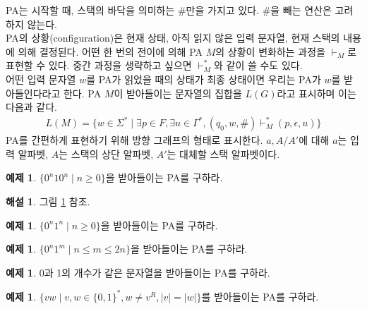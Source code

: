 \documentclass[b5paper, 11pt]{book}
\theoremstyle{definition}
\newtheorem{ex}[defn]{예제}
\newtheorem*{ans*}{해설}
\begin{document}
PA는 시작할 때, 스택의 바닥을 의미하는 \#만을 가지고 있다. \#을 빼는 연산은 고려하지 않는다. \\ 
PA의 상황(configuration)은 현재 상태, 아직 읽지 않은 입력 문자열, 현재 스택의 내용에 의해 결정된다. 어떤 한 번의 전이에 의해 PA $M$의 상황이 변화하는 과정을 $\vdash_M$로 표현할 수 있다. 중간 과정을 생략하고 싶으면 $\vdash_M^*$와 같이 쓸 수도 있다. \\ 
어떤 입력 문자열 $w$를 PA가 읽었을 때의 상태가 최종 상태이면 우리는 PA가 $w$를 받아들인다라고 한다. PA $M$이 받아들이는 문자열의 집합을 $L(G)$라고 표시하며 이는 다음과 같다.
\begin{align*}
    L(M) = \{w \in \Sigma^* \;\vert\; \exists p\in F, \exists u \in \Gamma^* , (q_0, w, \text{\#}) \vdash_M^* (p, \epsilon, u)\}
\end{align*}
PA를 간편하게 표현하기 위해 방향 그래프의 형태로 표시한다. $a, A/A'$에 대해 $a$는 입력 알파벳, $A$는 스택의 상단 알파벳, $A'$는 대체할 스택 알파벳이다. 
\begin{ex}\label{0n10n_ex}
    $\{0^n10^{n} \;\vert\; n \ge 0 \}$을 받아들이는 PA를 구하라. 
\end{ex}
\begin{ans*}
    그림 \ref{0n10n} 참조.
\end{ans*}
\begin{figure}[!ht]
    \centering
    \caption{} 
    \label{0n10n}
\end{figure}
\begin{ex}
    $\{0^n1^{n} \;\vert\; n \ge 0 \}$을 받아들이는 PA를 구하라.
\end{ex}
\begin{ex}
    $\{0^n1^{m} \;\vert\; n \le m \le 2n \}$을 받아들이는 PA를 구하라.
\end{ex}
\begin{ex}
    0과 1의 개수가 같은 문자열을 받아들이는 PA를 구하라. 
\end{ex}
\begin{ex}
    $\{ vw \;\vert\; v,w \in \{0,1\}^*, w \neq v^R , \vert v \vert = \vert w \vert \}$를 
    받아들이는 PA를 구하라.
\end{ex}
\end{document}
